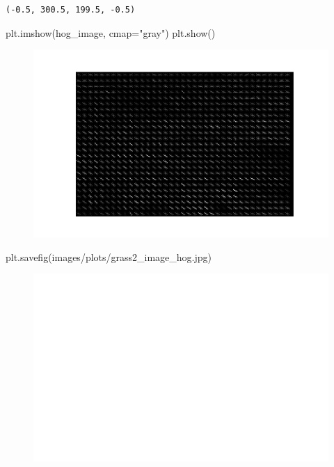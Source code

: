 \documentclass[
  letterpaper,
  DIV=11,
  numbers=noendperiod]{scrreprt}
\newenvironment{Shaded}{\begin{snugshade}}{\end{snugshade}}
\newcommand{\NormalTok}[1]{\textcolor[rgb]{0.00,0.23,0.31}{#1}}
\newcommand{\OperatorTok}[1]{\textcolor[rgb]{0.37,0.37,0.37}{#1}}
\newcommand{\StringTok}[1]{\textcolor[rgb]{0.13,0.47,0.30}{#1}}
\begin{document}
\begin{verbatim}
(-0.5, 300.5, 199.5, -0.5)
\end{verbatim}

\begin{Shaded}
\begin{Highlighting}[]
\NormalTok{plt.imshow(hog\_image, cmap}\OperatorTok{=}\StringTok{"gray"}\NormalTok{)}
\NormalTok{plt.show()}
\end{Highlighting}
\end{Shaded}

\begin{figure}[H]

{\centering \includegraphics{results_files/figure-pdf/unnamed-chunk-15-5.pdf}

}

\end{figure}

\begin{Shaded}
\begin{Highlighting}[]
\NormalTok{plt.savefig(}\StringTok{\textquotesingle{}images/plots/grass2\_image\_hog.jpg\textquotesingle{}}\NormalTok{)}
\end{Highlighting}
\end{Shaded}

\begin{figure}[H]

{\centering \includegraphics{results_files/figure-pdf/unnamed-chunk-15-6.pdf}

}

\end{figure}
\end{document}
